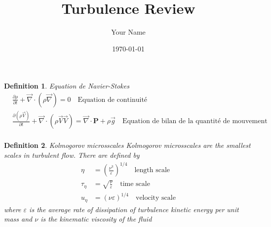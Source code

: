 \documentclass[a4paper,12pt]{article}
\title{Turbulence Review}
\author{Your Name}
\date{\today}
\newtheorem{definition}{Definition}
\begin{document}
\maketitle

\begin{definition}{Equation de Navier-Stokes}
    \begin{align}
        &\frac{\partial \rho}{\partial t}+\overrightarrow{\nabla}\cdot (\rho \overrightarrow{\nabla})=0 \quad \text{Equation de continuité} \\
        &\frac{\partial(\rho \overrightarrow{V})}{\partial t}+\overrightarrow{\nabla}\cdot(\rho\overrightarrow{V}\overrightarrow{V})=\overrightarrow{\nabla}\cdot \textbf{P}+\rho\overrightarrow{g} \quad \text{Equation de bilan de la quantité de mouvement} \\
        &
    \end{align}
\end{definition}
\begin{definition}{Kolmogorov microsscales}
    Kolmogorov microsscales are the smallest scales in turbulent flow. There are defined by 
    \begin{align}
        \eta &= \left( \frac{\nu^3}{\varepsilon} \right)^{1/4} \quad \text{length scale} \\
        \tau_\eta &= \sqrt{\frac{\nu}{\varepsilon}} \quad \text{time scale} \\
        u_\eta &= (\nu \varepsilon)^{1/4} \quad \text{velocity scale}
    \end{align}
    where \(\varepsilon\) is the average rate of dissipation of turbulence kinetic energy per unit mass and \(\nu\) is the kinematic viscosity of the fluid
\end{definition}


\end{document}
